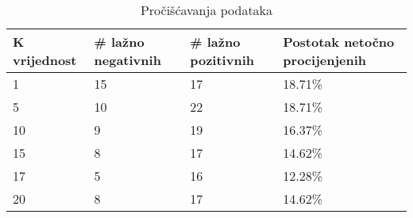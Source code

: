 \documentclass[times, utf8, zavrsni, numeric]{fer}
\begin{document}
\begin{table}[H]
\caption{Pročišćavanja podataka}
\begin{tabular}{| l | l | l | l |}
	\hline
\textbf{K vrijednost} & \textbf{\# lažno negativnih} & \textbf{\# lažno pozitivnih} & \textbf{Postotak netočno procijenjenih} \\ \hline
1            & 15                  & 17                  & 18.71\%                        \\ \hline
5            & 10                  & 22                  & 18.71\%                        \\ \hline
10           & 9                   & 19                  & 16.37\%                        \\ \hline
15           & 8                   & 17                  & 14.62\%                        \\ \hline
17           & 5                   & 16                  & 12.28\%\\ \hline
20           & 8                   & 17                  & 14.62\%\\ \hline
\end{tabular}
\label{fig:milke}
\end{table}
\end{document}

